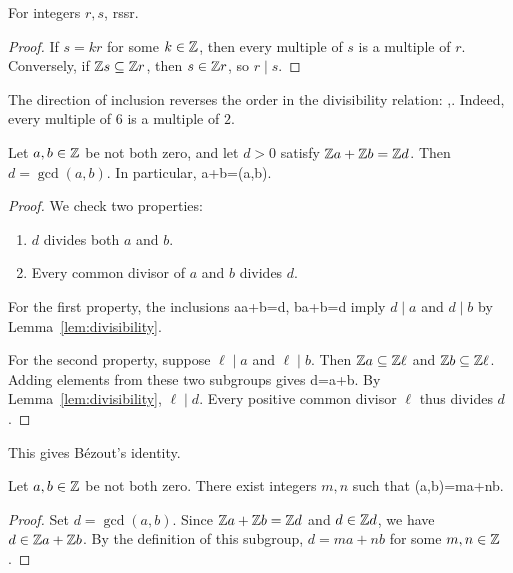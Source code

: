\documentclass[reqno,11pt]{amsart}
\begin{document}
\begin{lemma}\label{lem:divisibility}
	For integers $r,s$,
	\be
	r\mid s\quad\Longleftrightarrow\quad\Z s\subseteq\Z r.
	\ee
\end{lemma}

\begin{proof}
	If $s=kr$ for some $k\in\mathbb{Z}$, then every multiple of $s$ is a multiple
	of $r$. Conversely, if $\mathbb{Z} s\subseteq\mathbb{Z} r$, then $s\in\mathbb{Z} r$, so $r\mid s$.
\end{proof}

\begin{example}
	The direction of inclusion reverses the order in the divisibility relation:
	,\Z{}\Z.
	\ee
	Indeed, every multiple of $6$ is a multiple of $2$.
\end{example}

\begin{proposition}
	Let $a,b\in\mathbb{Z}$ be not both zero, and let $d>0$ satisfy
	$\mathbb{Z} a+\mathbb{Z} b=\mathbb{Z} d$. Then $d=\gcd(a,b)$. In particular,
	\be
	\Z a+\Z b=\Z\gcd(a,b).
	\ee
\end{proposition}

\begin{proof}
	We check two properties:
	\begin{enumerate}[label=\textbf{(\arabic*)}]
			\item $d$ divides both $a$ and $b$.
			\item Every common divisor of $a$ and $b$ divides $d$.
		\end{enumerate}
	For the first property, the inclusions
	\be
	\Z a\subseteq\Z a+\Z b=\Z d,
	\qquad
	\Z b\subseteq\Z a+\Z b=\Z d
	\ee
	imply $d\mid a$ and $d\mid b$ by Lemma~\ref{lem:divisibility}.

	For the second property, suppose $\ell\mid a$ and $\ell\mid b$.
	Then $\mathbb{Z} a\subseteq\mathbb{Z}\ell$ and $\mathbb{Z} b\subseteq\mathbb{Z}\ell$. Adding elements
	from these two subgroups gives
	\be
	\Z d=\Z a+\Z b\subseteq\Z\ell.
	\ee
	By Lemma~\ref{lem:divisibility}, $\ell\mid d$.
	Every positive common divisor $\ell$ thus  divides $d$.
\end{proof}

This gives B\'ezout's identity.

\begin{corollary}
	Let $a,b\in\mathbb{Z}$ be not both zero. There exist integers $m,n$ such that
	\be
	\gcd(a,b)=ma+nb.
	\ee
\end{corollary}

\begin{proof}
	Set $d=\gcd(a,b)$. Since $\mathbb{Z} a+\mathbb{Z} b=\mathbb{Z} d$ and $d\in\mathbb{Z} d$, we have
	$d\in\mathbb{Z} a+\mathbb{Z} b$. By the definition of this subgroup, $d=ma+nb$ for some
	$m,n\in\mathbb{Z}$.
\end{proof}
\end{document}
